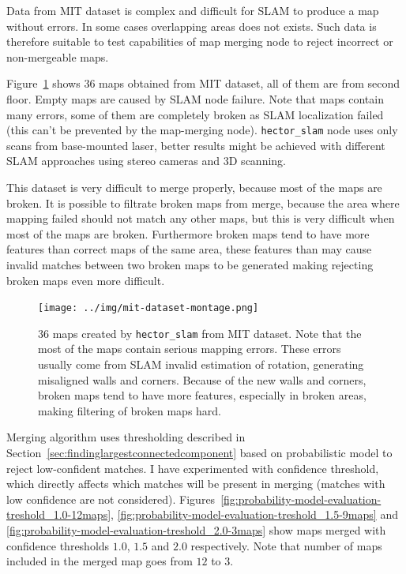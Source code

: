 Data from \gls{MIT} dataset is complex and difficult for \gls{SLAM} to produce a map without errors. In some cases overlapping areas does not exists. Such data is therefore suitable to test capabilities of map merging node to reject incorrect or non-mergeable maps.

Figure~\ref{fig:probability-model-evaluation-montage} shows $36$ maps obtained from \gls{MIT} dataset, all of them are from second floor. Empty maps are caused by \gls{SLAM} node failure. Note that maps contain many errors, some of them are completely broken as \gls{SLAM} localization failed (this can't be prevented by the map-merging node). \texttt{hector\_slam} node uses only scans from base-mounted laser, better results might be achieved with different \gls{SLAM} approaches using stereo cameras and 3D scanning.

This dataset is very difficult to merge properly, because most of the maps are broken. It is possible to filtrate broken maps from merge, because the area where mapping failed should not match any other maps, but this is very difficult when most of the maps are broken. Furthermore broken maps tend to have more features than correct maps of the same area, these features than may cause invalid matches between two broken maps to be generated making rejecting broken maps even more difficult.

\begin{figure}
    \centering
    \texttt{[image: ../img/mit-dataset-montage.png]}
    \caption[$36$ maps created by \texttt{hector\_slam} from \gls{MIT} dataset.]{$36$ maps created by \texttt{hector\_slam} from \gls{MIT} dataset. Note that the most of the maps contain serious mapping errors. These errors usually come from \gls{SLAM} invalid estimation of rotation, generating misaligned walls and corners. Because of the new walls and corners, broken maps tend to have more features, especially in broken areas, making filtering of broken maps hard.}
    \label{fig:probability-model-evaluation-montage}
\end{figure}

Merging algorithm uses thresholding described in Section~\ref{sec:findinglargestconnectedcomponent} based on probabilistic model to reject low-confident matches. I have experimented with confidence threshold, which directly affects which matches will be present in merging (matches with low confidence are not considered). Figures~\ref{fig:probability-model-evaluation-treshold_1.0-12maps}, \ref{fig:probability-model-evaluation-treshold_1.5-9maps} and \ref{fig:probability-model-evaluation-treshold_2.0-3maps} show maps merged with confidence thresholds $1.0$, $1.5$ and $2.0$ respectively. Note that number of maps included in the merged map goes from $12$ to $3$.


